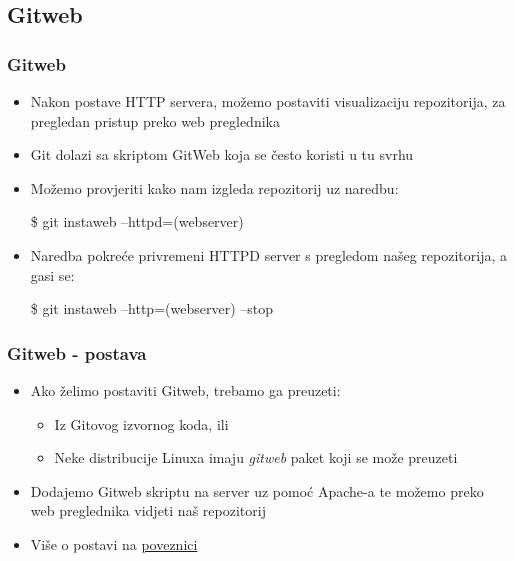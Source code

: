 \subsection{Gitweb}

\begin{frame}
\frametitle{Gitweb}
\begin{itemize}
	\item Nakon postave HTTP servera, možemo postaviti visualizaciju repozitorija, za pregledan pristup preko web preglednika
	\item Git dolazi sa skriptom GitWeb koja se često koristi u tu svrhu
	\item Možemo provjeriti kako nam izgleda repozitorij uz naredbu:

	\$ git instaweb --httpd=(webserver)

	\item Naredba pokreće privremeni HTTPD server s pregledom našeg repozitorija, a gasi se:

	\$ git instaweb --http=(webserver) --stop
\end{itemize}
\end{frame}

\begin{frame}
\frametitle{Gitweb - postava}
\begin{itemize}
	\item Ako želimo postaviti Gitweb, trebamo ga preuzeti:
	\begin{itemize}
		\item Iz Gitovog izvornog koda, ili
		\item Neke distribucije Linuxa imaju \textit{gitweb} paket koji se može preuzeti
	\end{itemize}
	\item Dodajemo Gitweb skriptu na server uz pomoć Apache-a te možemo preko web preglednika vidjeti naš repozitorij
	\item Više o postavi na \href{https://git-scm.com/book/en/v2/Git-on-the-Server-GitWeb}{poveznici}
\end{itemize}
\end{frame}